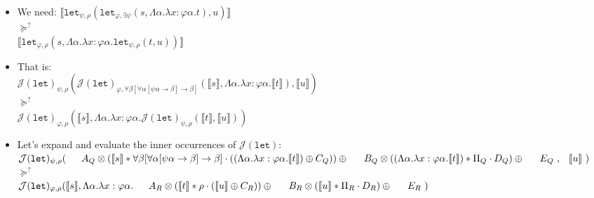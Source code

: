 \documentclass[runningheads,a4paper]{llncs}
\newcommand{\Termmap}{\mathcal{J}}
\newcommand{\interpret}[1]{\llbracket #1 \rrbracket}
\newcommand{\arrtype}{\rightarrow}
\begin{document}
\begin{itemize}
\item We need:
  $\interpret{\mathtt{let}_{\psi,\rho}(\mathtt{let}_{\varphi,\exists
  \psi}(s,\Lambda \alpha.\lambda x : \varphi\alpha.t),u)}$ \\
  $\succeq^?$ \\
  $\interpret{\mathtt{let}_{\varphi,\rho}(s,\Lambda \alpha.\lambda x:
  \varphi\alpha.\mathtt{let}_{\psi,\rho}(t,u))}$
\item That is: \\
  $\Termmap(\mathtt{let})_{\psi,\rho}(
  \Termmap(\mathtt{let})_{\varphi,\forall\beta[\forall\alpha[\psi\alpha
  \arrtype \beta] \arrtype \beta]}(
  \interpret{s},\Lambda \alpha.\lambda x : \varphi\alpha.\interpret{t}),
  \interpret{u})$ \\
  $\succeq^?$ \\
  $\Termmap(\mathtt{let})_{\varphi,\rho}(
  \interpret{s},\Lambda \alpha.\lambda x:\varphi\alpha.
  \Termmap(\mathtt{let})_{\psi,\rho}(\interpret{t},\interpret{u}))$
\item Let's expand and evaluate the inner occurrences of
  $\Termmap(\mathtt{let})$: \\
  $\Termmap(\mathtt{let})_{\psi,\rho}( \\
  \phantom{AB}
    A_Q \otimes (\interpret{s} * \forall\beta[\forall \alpha[\psi\alpha
    \arrtype \beta] \arrtype \beta] \cdot ((\Lambda \alpha.\lambda x :
  \varphi\alpha.\interpret{t}) \oplus C_Q)) \oplus \\
  \phantom{AB}
    B_Q \otimes ((\Lambda \alpha.\lambda x : \varphi\alpha.\interpret{t})
    * \Pi_Q \cdot D_Q) \oplus \\
  \phantom{AB}
    E_Q\ , \\
  \phantom{A} \interpret{u}\ )$ \\
  $\succeq^?$ \\
  $\Termmap(\mathtt{let})_{\varphi,\rho}(
  \interpret{s},\Lambda \alpha.\lambda x:\varphi\alpha. \\
  \phantom{AB}
  A_R \otimes (\interpret{t} * \rho \cdot (\interpret{u} \oplus
    C_R)) \oplus \\
  \phantom{AB}
    B_R \otimes (\interpret{u} * \Pi_R \cdot D_R) \oplus \\
  \phantom{AB}
  E_R\ )$ \\


\end{itemize}
\end{document}
